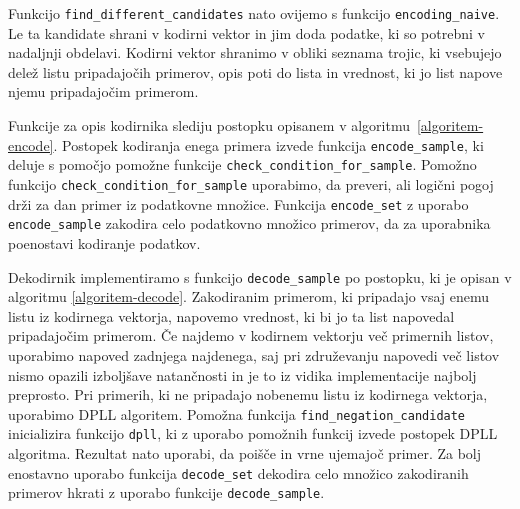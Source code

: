 \documentclass[12pt,a4paper,twoside]{article}
\theoremstyle{definition} %
\theoremstyle{plain} %
\numberwithin{equation}{section}  %
\begin{document}
Funkcijo \texttt{find\_\-different\_\-candidates} nato ovijemo s funkcijo \texttt{encoding\_\-naive}.
Le ta kandidate shrani v kodirni vektor in jim doda podatke, ki so potrebni v nadaljnji obdelavi.
Kodirni vektor shranimo v obliki seznama trojic, ki vsebujejo delež listu pripadajočih primerov, opis poti do lista in vrednost, ki jo list napove njemu pripadajočim primerom.





Funkcije za opis kodirnika slediju postopku opisanem v algoritmu~\ref{algoritem-encode}.
Postopek kodiranja enega primera izvede funkcija \texttt{encode\_sample}, ki deluje s pomočjo pomožne funkcije \texttt{check\_condition\_for\_sample}.
Pomožno funkcijo \texttt{check\_condition\_for\_sample} uporabimo, da preveri, ali logični pogoj drži za dan primer iz podatkovne množice.
Funkcija \texttt{encode\_set} z uporabo \texttt{encode\_sample} zakodira celo podatkovno množico primerov, da za uporabnika poenostavi kodiranje podatkov.



Dekodirnik implementiramo s funkcijo \texttt{decode\_sample} po postopku, ki je opisan v algoritmu \ref{algoritem-decode}.
Zakodiranim primerom, ki pripadajo vsaj enemu listu iz kodirnega vektorja, napovemo vrednost, ki bi jo ta list napovedal pripadajočim primerom.
Če najdemo v kodirnem vektorju več primernih listov, uporabimo napoved zadnjega najdenega, 
saj pri združevanju napovedi več listov nismo opazili izboljšave natančnosti in je to iz vidika implementacije najbolj preprosto.
Pri primerih, ki ne pripadajo nobenemu listu iz kodirnega vektorja, uporabimo DPLL algoritem. %
Pomožna funkcija \texttt{find\_negation\_candidate} inicializira funkcijo \texttt{dpll}, ki z uporabo pomožnih funkcij izvede postopek DPLL algoritma. %
Rezultat nato uporabi, da poišče in vrne ujemajoč primer.
Za bolj enostavno uporabo funkcija \texttt{decode\_set} dekodira celo množico zakodiranih primerov hkrati z uporabo funkcije \texttt{decode\_sample}.
\end{document}

